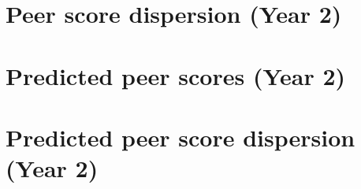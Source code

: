 \documentclass[11pt]{article}
\begin{document}
\begin{table}[H]
	\caption{Academy cohort and county fixed effects}
	
\end{table}

\begin{table}[H]
	\caption{Academy fixed effects}
	
\end{table}

\section*{Peer score dispersion (Year 2)}

\begin{table}[H]
	\caption{Academy fixed effects}
	
\end{table}

\section*{Predicted peer scores (Year 2)}

\begin{table}[H]
	\caption{Academy cohort fixed effects}
	
\end{table}

\section*{Predicted peer score dispersion (Year 2)}

\begin{table}[H]
	\caption{Academy cohort fixed effects}
	
\end{table}
\end{document}
